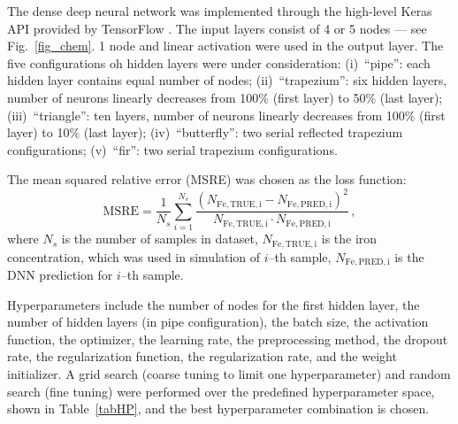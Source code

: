 \documentclass[num-refs]{wiley-article} %
\begin{document}
The dense deep neural network was implemented through the high-level Keras API provided by TensorFlow \cite{Keras}.
The input layers consist of 4 or 5 nodes --- see Fig.~\ref{fig_chem}.
1 node and linear activation were used in the output layer.
The five configurations oh hidden layers were under consideration:
(i)~``pipe'': each hidden layer contains equal number of nodes;
(ii)~``trapezium'': six hidden layers, number of neurons linearly decreases from 100\% (first layer) to 50\% (last layer);
(iii)~``triangle'': ten layers, number of neurons linearly decreases from 100\% (first layer) to 10\% (last layer);
(iv)~``butterfly'': two serial reflected trapezium configurations;
(v)~``fir'': two serial trapezium configurations.

The mean squared relative error (MSRE) was chosen as the loss function:
\begin{equation}
\label{eqMSRE}
    \mathrm{MSRE}=\frac{1}{N_s}\sum_{i=1}^{N_s}\frac{(N_\mathrm{Fe,TRUE,i}-N_\mathrm{Fe,PRED,i})^2}{N_\mathrm{Fe,TRUE,i}\cdot N_\mathrm{Fe,PRED,i}}\,,
\end{equation}
where
$N_s$ is the number of samples in dataset,
$N_\mathrm{Fe,TRUE,i}$ is the iron concentration, which was used in simulation of $i$--th sample,
$N_\mathrm{Fe,PRED,i}$ is the DNN prediction for $i$--th sample.

Hyperparameters include the number of nodes for the first hidden layer,
the number of hidden layers (in pipe configuration),
the batch size,
the activation function,
the optimizer,
the learning rate,
the preprocessing method,
the dropout rate,
the regularization function,
the regularization rate,
and the weight initializer.
A grid search (coarse tuning to limit one hyperparameter) and random search (fine tuning) were performed over the predefined hyperparameter space, shown in Table~\ref{tabHP}, and the best hyperparameter combination is chosen.
\end{document}

